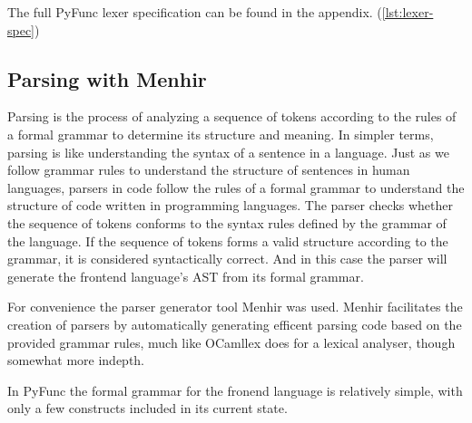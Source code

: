\documentclass{l4proj}
\begin{document}
The full PyFunc lexer specification can be found in the appendix. (\ref{lst:lexer-spec})


\subsection{Parsing with Menhir}

Parsing is the process of analyzing a sequence of tokens according to the rules of a formal grammar to determine its structure and meaning.
In simpler terms, parsing is like understanding the syntax of a sentence in a language.
Just as we follow grammar rules to understand the structure of sentences in human languages, parsers in code follow the rules of a formal grammar to understand the structure of code written in programming languages.
The parser checks whether the sequence of tokens conforms to the syntax rules defined by the grammar of the language.
If the sequence of tokens forms a valid structure according to the grammar, it is considered syntactically correct.
And in this case the parser will generate the frontend language's AST from its formal grammar.

For convenience the parser generator tool Menhir was used.
Menhir facilitates the creation of parsers by automatically generating efficent parsing code based on the provided grammar rules, much like OCamllex does for a lexical analyser, though somewhat more indepth.

In PyFunc the formal grammar for the fronend language is relatively simple, with only a few constructs included in its current state.
\end{document}
